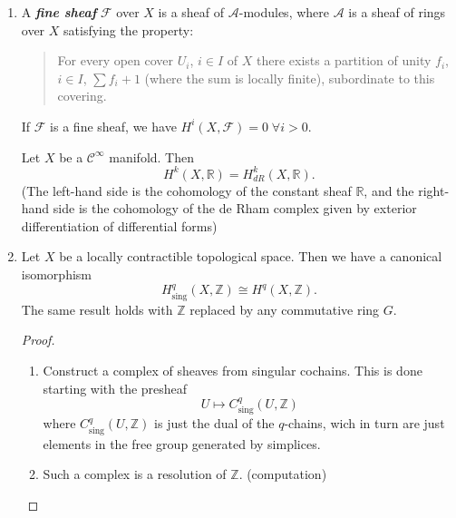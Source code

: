 \documentclass{article}
\numberwithin{equation}{section}
\newcommand{\R}{\mathbb{R}}
\newcommand{\Z}{\mathbb{Z}}
\newcommand{\Ac}{\mathcal{A}}
\newcommand{\Cc}{\mathcal{C}}
\newcommand{\Fc}{\mathcal{F}}
\DeclareMathOperator{\sing}{sing}
\begin{document}
\begin{enumerate}
\begin{defn}[4.33]
			A sheaf $\Fc$ is called \textbf{\textit{flasque}} if for ever pair of open sets $V\subset U$, the restriction map $\rho_{UV}:\Fc(U)\to\Fc(V)$ is surjective.
		\end{defn}
		\begin{prop}[4.34]
			Flasque sheaves are acyclic for the functor $\Gamma$.
		\end{prop}
		\clearpage
		\item \begin{defn}[4.35]
			A \textbf{\textit{fine sheaf}} $\Fc$ over $X$ is a sheaf of $\Ac$-modules, where $\Ac$ is a sheaf of rings over $X$ satisfying the property:
			\begin{quotation}
				For every open cover $U_i$, $i\in I$ of $X$ there exists a partition of unity $f_i$, $i\in I$, $\sum f_i+1$ (where the sum is locally finite), subordinate to this covering.
			\end{quotation}
		\end{defn}
		\begin{prop}[4.36]
			If $\Fc$ is a fine sheaf, we have $H^i(X,\Fc)=0\;\forall i>0$.
		\end{prop}
		\begin{coro}[4.37]
			Let $X$ be a $\Cc^\infty$ manifold. Then
			\[H^k(X,\R)=H^k_{dR}(X,\R).\]
			(The left-hand side is the cohomology of the constant sheaf $\R$, and the right-hand side is the cohomology of the de Rham complex given by exterior differentiation of differential forms)
		\end{coro}
		
		\item \begin{thm}[4.47]
			Let $X$ be a locally contractible topological space. Then we have a canonical isomorphism
			\[H^q_{\sing}(X,\Z)\cong H^q(X,\Z).\]
			The same result holds with $\Z$ replaced by any commutative ring $G$.
		\end{thm}
		\begin{proof}\leavevmode
			\begin{enumerate}
				\item Construct a complex of sheaves from singular cochains. This is done starting with the presheaf
				\[U\mapsto C^q_{\sing}(U,\Z)\]
				where $C^q_{\sing}(U,\Z)$ is just the dual of the $q$-chains, wich in turn are just elements in the free group generated by simplices.
				
				\item Such a complex is a resolution of $\Z$. (computation)
				

\end{enumerate}
\end{proof}
\end{enumerate}
\end{document}
